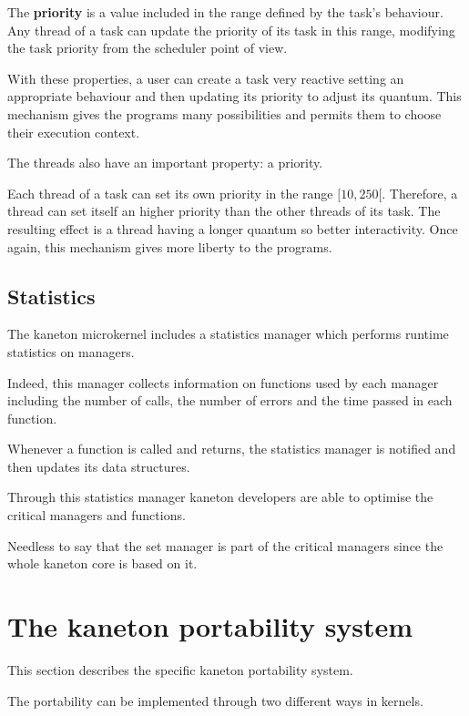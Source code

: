 \begin{multicols}{2}
The \textbf{priority} is a value included in the range defined by the
task's behaviour. Any thread of a task can update the priority of its
task in this range, modifying the task priority from the scheduler
point of view.

With these properties, a user can create a task very reactive setting an
appropriate behaviour and then updating its priority to adjust its quantum.
This mechanism gives the programs many possibilities and permits them to
choose their execution context.

The threads also have an important property: a priority.

Each thread of a task can set its own priority in the range $[10, 250[$.
Therefore, a thread can set itself an higher priority than the other
threads of its task. The resulting effect is a thread having a longer quantum
so better interactivity. Once again, this mechanism gives more liberty to the
programs.

%
%

\subsection{Statistics}

The kaneton microkernel includes a statistics manager which performs
runtime statistics on managers.

Indeed, this manager collects information on functions used by each manager
including the number of calls, the number of errors and the time passed
in each function.

Whenever a function is called and returns, the statistics manager is notified
and then updates its data structures.

Through this statistics manager kaneton developers are able to optimise
the critical managers and functions.

Needless to say that the set manager is part of the critical managers since
the whole kaneton core is based on it.

%
%

\section{The kaneton portability system}

This section describes the specific kaneton portability system.

The portability can be implemented through two different ways in kernels.


\end{multicols}
